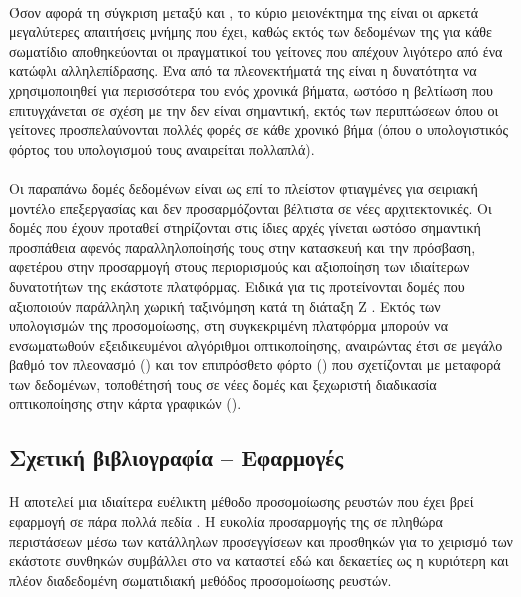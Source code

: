 \paragraph{} Όσον αφορά τη σύγκριση μεταξύ  και , το κύριο μειονέκτημα
της  είναι οι αρκετά μεγαλύτερες απαιτήσεις μνήμης που έχει, καθώς εκτός των
δεδομένων της  για κάθε σωματίδιο αποθηκεύονται οι πραγματικοί του γείτονες που
απέχουν λιγότερο από ένα κατώφλι αλληλεπίδρασης. Ένα από τα πλεονεκτήματά της είναι η
δυνατότητα να χρησιμοποιηθεί για περισσότερα του ενός χρονικά βήματα, ωστόσο η βελτίωση
που επιτυγχάνεται σε σχέση με την  δεν είναι σημαντική, εκτός των περιπτώσεων
όπου οι γείτονες προσπελαύνονται πολλές φορές σε κάθε χρονικό βήμα (όπου ο υπολογιστικός
φόρτος του υπολογισμού τους αναιρείται πολλαπλά).

\paragraph{} Οι παραπάνω δομές δεδομένων είναι ως επί το πλείστον φτιαγμένες για σειριακή
μοντέλο επεξεργασίας και δεν προσαρμόζονται βέλτιστα σε νέες  αρχιτεκτονικές. Οι
δομές που έχουν προταθεί στηρίζονται στις ίδιες αρχές γίνεται ωστόσο σημαντική προσπάθεια
αφενός παραλληλοποίησής τους στην κατασκευή και την πρόσβαση, αφετέρου στην προσαρμογή
στους περιορισμούς και αξιοποίηση των ιδιαίτερων δυνατοτήτων της εκάστοτε
πλατφόρμας. Ειδικά για τις  προτείνονται δομές που αξιοποιούν παράλληλη χωρική
ταξινόμηση κατά τη διάταξη Ζ \cite{goswami2010interactive}. Εκτός των υπολογισμών της
προσομοίωσης, στη συγκεκριμένη πλατφόρμα μπορούν να ενσωματωθούν εξειδικευμένοι αλγόριθμοι
οπτικοποίησης, αναιρώντας έτσι σε μεγάλο βαθμό τον πλεονασμό () και τον
επιπρόσθετο φόρτο () που σχετίζονται με μεταφορά των δεδομένων, τοποθέτησή
τους σε νέες δομές και ξεχωριστή διαδικασία οπτικοποίησης στην κάρτα γραφικών
().

\subsection{Σχετική βιβλιογραφία -- Εφαρμογές}
\paragraph{} Η  αποτελεί μια ιδιαίτερα ευέλικτη μέθοδο προσομοίωσης ρευστών που
έχει βρεί εφαρμογή σε πάρα πολλά πεδία \cite{monaghan2012smoothed}. H ευκολία προσαρμογής
της σε πληθώρα περιστάσεων μέσω των κατάλληλων προσεγγίσεων και προσθηκών για το χειρισμό
των εκάστοτε συνθηκών συμβάλλει στο να καταστεί εδώ και δεκαετίες ως η κυριότερη και πλέον
διαδεδομένη σωματιδιακή μεθόδος προσομοίωσης ρευστών.

